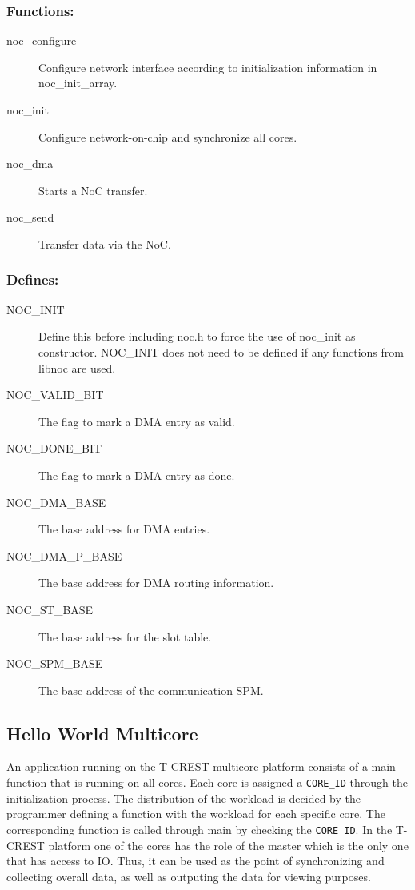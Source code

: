 \documentclass[a4paper,fontsize=10pt,twoside,DIV15,BCOR12mm,headinclude=true,footinclude=false,pagesize,bibtotoc]{scrbook}
\newcommand{\code}[1]{{\texttt{#1}}}
\begin{document}
\subsubsection{Functions:}
\begin{description}
\item [noc\_configure] Configure network interface according to initialization information in noc\_init\_array.
\item [noc\_init] Configure network-on-chip and synchronize all cores. 
\item [noc\_dma] Starts a NoC transfer. 
\item [noc\_send] Transfer data via the NoC. 
\end{description}

\subsubsection{Defines:}
\begin{description}
\item [NOC\_INIT] Define this before including noc.h to force the use of noc\_init as constructor. NOC\_INIT does not need to be defined if any functions from libnoc are used.
\item [NOC\_VALID\_BIT] The flag to mark a DMA entry as valid.
\item [NOC\_DONE\_BIT] The flag to mark a DMA entry as done.
\item [NOC\_DMA\_BASE] The base address for DMA entries.
\item [NOC\_DMA\_P\_BASE] The base address for DMA routing information.
\item [NOC\_ST\_BASE] The base address for the slot table.
\item [NOC\_SPM\_BASE] The base address of the communication SPM.
\end{description}

\subsection{Hello World Multicore}

An application running on the T-CREST multicore platform consists of a main function that is running on all cores.
Each core is assigned a \code{CORE\_ID} through the initialization process. The distribution of the workload is 
decided by the programmer defining a function with the workload for each specific core. The corresponding function
is called through main by checking the \code{CORE\_ID}. In the T-CREST platform one of the cores has the role of the master
which is the only one that has access to IO. Thus, it can be used as the point of synchronizing and collecting overall data,
as well as outputing the data for viewing purposes.
\end{document}
